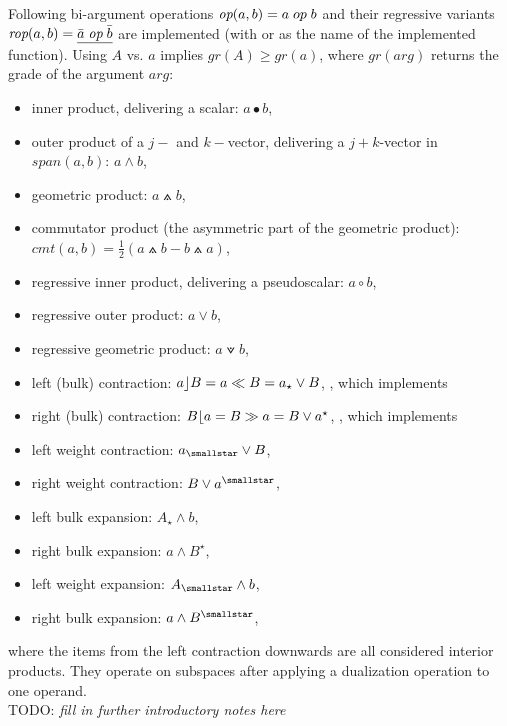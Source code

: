 Following bi-argument operations $\emph{op}(a,b) = a \; op \; b$ and their regressive
variants $\emph{rop}(a,b) = \underline{\bar{a} \; \emph{op} \; \bar{b}}$ are implemented
(with  or  as the name of the implemented function). Using
$A$ vs. $a$ implies $gr(A) \ge gr(a)$, where $gr(arg)$ returns the grade of the argument
$arg$:
\begin{itemize}
    \item inner product, delivering a scalar: $a \bullet b$, 
    \item outer product of a $j-$ and $k-$vector, delivering a $j+k$-vector in
    $span(a,b)$: $a \wedge b$, 
    \item geometric product:  $a \wedgedot b$, 
    \item commutator product (the asymmetric part of the geometric product): $cmt(a,b) =
    \frac{1}{2}(a \wedgedot b - b \wedgedot a)$,
    \item regressive inner product, delivering a pseudoscalar: $a \circ b$,
    \item regressive outer product: $a \vee b$, 
    \item regressive geometric product: $a \veedot b$, 
    
    \item left (bulk) contraction: $a \rfloor B = a \ll B = a_{\star} \vee B $,
    , which implements   
    \item right (bulk) contraction: $B \lfloor a = B \gg a = B \vee a^{\star} $,
    , which implements 

    \item left weight contraction: $a_{\smallstar} \vee B $,
    \item right weight contraction: $B \vee a^{\smallstar} $,

    \item left bulk expansion: $A_{\star} \wedge b $,
    \item right bulk expansion: $a \wedge B^{\star} $,

    \item left weight expansion: $A_{\smallstar} \wedge b $,
    \item right bulk expansion: $a \wedge B^{\smallstar} $,
\end{itemize}
where the items from the left contraction downwards are all considered interior products.
They operate on subspaces after applying a dualization operation to one operand. \\


TODO: \emph{fill in further introductory notes here} \\

\newpage
